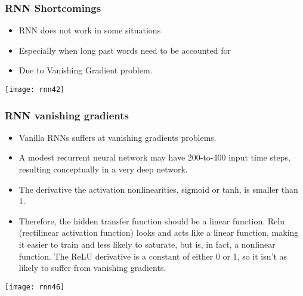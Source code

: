 


\begin{frame}[fragile] \frametitle{RNN Shortcomings}
\begin{itemize}
\item RNN does not work in some situations
\item Especially when long past words need to be accounted for
\item Due to Vanishing Gradient problem.
\end{itemize}

\begin{center}
\texttt{[image: rnn42]}
\end{center}
\end{frame}

\begin{frame}[fragile] \frametitle{RNN vanishing gradients}
\begin{itemize}
\item Vanilla RNNs suffers at vanishing gradients problems.
\item A modest recurrent neural network may have 200-to-400 input time steps, resulting conceptually in a very deep network.
\item The derivative the activation nonlinearities, sigmoid or tanh, is smaller
than 1.
\item Therefore, the hidden transfer function should be a linear function. Relu (rectilinear activation function) looks and acts like a linear function, making it easier to train and less likely to saturate, but is, in fact, a nonlinear function. The ReLU derivative is a constant of either 0 or 1, so it isn’t as likely to suffer from vanishing gradients.
\end{itemize}

\begin{center}
\texttt{[image: rnn46]}
\end{center}
\end{frame}

